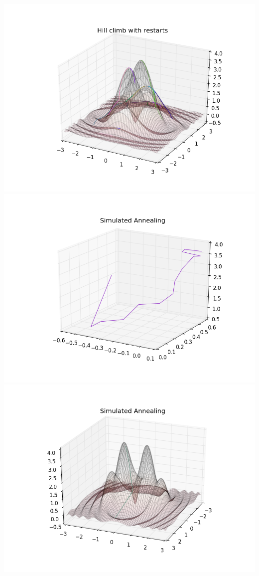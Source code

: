 \documentclass[letter,12pt]{article}
\begin{document}
\includegraphics[scale=0.35]{hill_climb_random_graph}
\includegraphics[scale=0.35]{simulated_annealing}
\includegraphics[scale=0.35]{simulated_annealing_graph}
\end{document}
